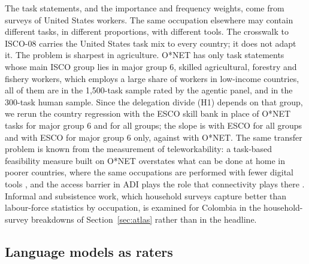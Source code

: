 The task statements, and the importance and frequency weights, come from surveys of United States workers.
The same occupation elsewhere may contain different tasks, in different proportions, with different tools.
The crosswalk to ISCO-08 carries the United States task mix to every country; it does not adapt it.
The problem is sharpest in agriculture.
O*NET has only  task statements whose main ISCO group lies in major group 6, skilled agricultural, forestry and fishery workers, which employs a large share of workers in low-income countries, all  of them are in the 1,500-task sample rated by the agentic panel, and  in the 300-task human sample.
Since the delegation divide (H1) depends on that group, we rerun the country regression with the ESCO skill bank in place of O*NET tasks for major group 6 and for all groups; the slope is  with ESCO for all groups and  with ESCO for major group 6 only, against  with O*NET.
The same transfer problem is known from the measurement of teleworkability: a task-based feasibility measure built on O*NET \citep{dingel2020how} overstates what can be done at home in poorer countries, where the same occupations are performed with fewer digital tools \citep{gottlieb2021working}, and the access barrier in ADI plays the role that connectivity plays there \citep{gmyrek2024buffer}.
Informal and subsistence work, which household surveys capture better than labour-force statistics by occupation, is examined for Colombia in the household-survey breakdowns of Section~\ref{sec:atlas} rather than in the headline.

\subsection{Language models as raters}

